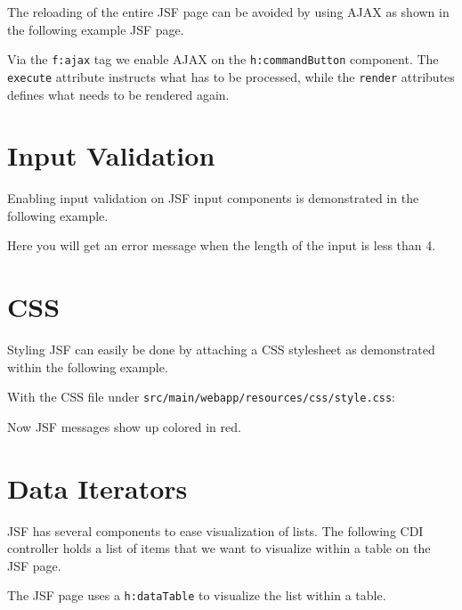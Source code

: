 The reloading of the entire JSF page can be avoided by using AJAX as shown in the following example JSF page.


Via the \texttt{f:ajax} tag we enable AJAX on the \texttt{h:commandButton} component.
The \texttt{execute} attribute instructs what has to be processed, while the \texttt{render} attributes defines what needs to be rendered again.

\section{Input Validation}

Enabling input validation on JSF input components is demonstrated in the following example.


Here you will get an error message when the length of the input is less than 4.

\section{CSS}

Styling JSF can easily be done by attaching a CSS stylesheet as demonstrated within the following example.


With the CSS file under \texttt{src/main/webapp/resources/css/style.css}:


Now JSF messages show up colored in red.

\section{Data Iterators}

JSF has several components to ease visualization of lists.
The following CDI controller holds a list of items that we want to visualize within a table on the JSF page.


The JSF page uses a \texttt{h:dataTable} to visualize the list within a table.



